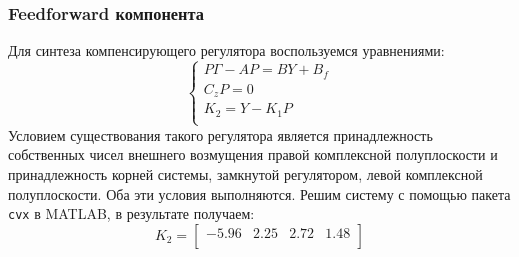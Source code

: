 \subsubsection{Feedforward компонента}
Для синтеза компенсирующего регулятора воспользуемся уравнениями: 
\begin{equation}
    \begin{cases}
        P\Gamma - AP = BY + B_f \\ 
        C_z P = 0 \\ 
        K_2 = Y - K_1 P \\ 
    \end{cases}
\end{equation}
Условием существования такого регулятора является принадлежность собственных чисел 
внешнего возмущения правой комплексной полуплоскости и принадлежность корней 
системы, замкнутой регулятором, левой комплексной полуплоскости. Оба эти условия выполняются. 
Решим систему с помощью пакета \texttt{cvx} в MATLAB, в результате получаем:
\begin{equation}
    K_2 = \begin{bmatrix}
        -5.96  & 2.25  & 2.72  & 1.48 \\ 
    \end{bmatrix} 
\end{equation}

